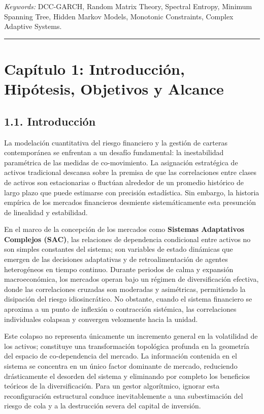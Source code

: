 \documentclass[
  12pt,
]{article}
\begin{document}
\emph{Keywords:} DCC-GARCH, Random Matrix Theory, Spectral Entropy,
Minimum Spanning Tree, Hidden Markov Models, Monotonic Constraints,
Complex Adaptive Systems.

\begin{center}\rule{0.5\linewidth}{0.5pt}\end{center}

\section{Capítulo 1: Introducción, Hipótesis, Objetivos y
Alcance}\label{capuxedtulo-1-introducciuxf3n-hipuxf3tesis-objetivos-y-alcance}

\subsection{1.1. Introducción}\label{introducciuxf3n}

La modelación cuantitativa del riesgo financiero y la gestión de
carteras contemporánea se enfrentan a un desafío fundamental: la
inestabilidad paramétrica de las medidas de co-movimiento. La asignación
estratégica de activos tradicional descansa sobre la premisa de que las
correlaciones entre clases de activos son estacionarias o fluctúan
alrededor de un promedio histórico de largo plazo que puede estimarse
con precisión estadística. Sin embargo, la historia empírica de los
mercados financieros desmiente sistemáticamente esta presunción de
linealidad y estabilidad.

En el marco de la concepción de los mercados como \textbf{Sistemas
Adaptativos Complejos (SAC)}, las relaciones de dependencia condicional
entre activos no son simples constantes del sistema; son variables de
estado dinámicas que emergen de las decisiones adaptativas y de
retroalimentación de agentes heterogéneos en tiempo continuo. Durante
periodos de calma y expansión macroeconómica, los mercados operan bajo
un régimen de diversificación efectiva, donde las correlaciones cruzadas
son moderadas y asimétricas, permitiendo la disipación del riesgo
idiosincrático. No obstante, cuando el sistema financiero se aproxima a
un punto de inflexión o contracción sistémica, las correlaciones
individuales colapsan y convergen velozmente hacia la unidad.

Este colapso no representa únicamente un incremento general en la
volatilidad de los activos; constituye una transformación topológica
profunda en la geometría del espacio de co-dependencia del mercado. La
información contenida en el sistema se concentra en un único factor
dominante de mercado, reduciendo drásticamente el desorden del sistema y
eliminando por completo los beneficios teóricos de la diversificación.
Para un gestor algorítmico, ignorar esta reconfiguración estructural
conduce inevitablemente a una subestimación del riesgo de cola y a la
destrucción severa del capital de inversión.
\end{document}

